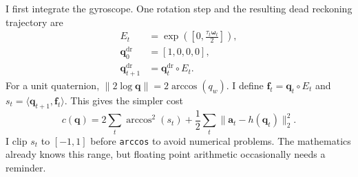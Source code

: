 \documentclass[letterpaper, 10pt, conference]{ieeeconf}
\newcommand{\q}{\mathbf{q}}
\newcommand{\w}{\boldsymbol{\omega}}
\begin{document}
I first integrate the gyroscope. One rotation step and the resulting dead
reckoning trajectory are
\begin{equation}
\begin{aligned}
E_t&=\exp\!\left(\left[0,\frac{\tau_t\w_t}{2}\right]\right),\\
\q_0^{\mathrm{dr}}&=[1,0,0,0],\\
\q_{t+1}^{\mathrm{dr}}&=\q_t^{\mathrm{dr}}\circ E_t.
\end{aligned}
\label{eq:deadreckon}
\end{equation}
For a unit quaternion, $\|2\log\q\|=2\arccos(q_w)$. I define
$\mathbf f_t=\q_t\circ E_t$ and
$s_t=\langle\q_{t+1},\mathbf f_t\rangle$. This gives the simpler cost
\begin{equation}
c(\q)=2\sum_t\arccos^2(s_t)
+\frac12\sum_t\|\mathbf a_t-h(\q_t)\|_2^2.
\label{eq:cmotion}
\end{equation}
I clip $s_t$ to $[-1,1]$ before \texttt{arccos} to avoid numerical problems.
The mathematics already knows this range, but floating point arithmetic
occasionally needs a reminder.
\end{document}
